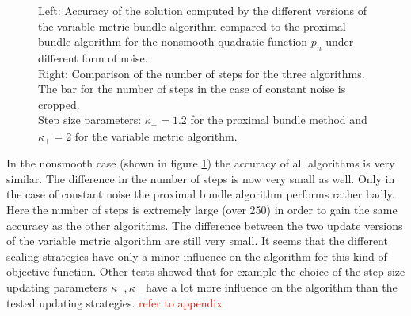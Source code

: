 \begin{figure}[ht]
	\begin{subfigure}[t]{0.49\textwidth}
	\end{subfigure}
	\begin{subfigure}[t]{0.49\textwidth}
	\end{subfigure}
	\caption{Left: Accuracy of the solution computed by the different versions of the variable metric bundle algorithm compared to the proximal bundle algorithm for the nonsmooth quadratic function \(p_n\) under different form of noise.\\
	Right: Comparison of the number of steps for the three algorithms. The bar for the number of steps in the case of constant noise is cropped.\\
	Step size parameters: \(\kappa_+ = 1.2\) for the proximal bundle method and \(\kappa_+ = 2\) for the variable metric algorithm.}
	\label{fig_bar_nonsm_parab}
\end{figure}

In the nonsmooth case (shown in figure \ref{fig_bar_nonsm_parab}) the accuracy of all algorithms is very similar. The difference in the number of steps is now very small as well.
Only in the case of constant noise the proximal bundle algorithm performs rather badly. Here the number of steps is extremely large (over 250) in order to gain the same accuracy as the other algorithms.
The difference between the two update versions of the variable metric algorithm are still very small. It seems that the different scaling strategies have only a minor influence on the algorithm for this kind of objective function. Other tests showed that for example the choice of the step size updating parameters \(\kappa_+, \kappa_-\) have a lot more influence on the algorithm than the tested updating strategies. \textcolor{red}{refer to appendix}



